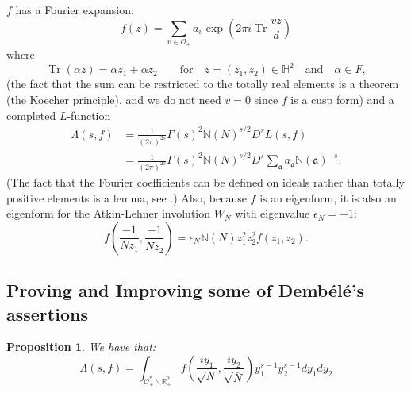 \documentclass{article}
\DeclareMathOperator{\Tr}{Tr}
\theoremstyle{plain}
\newtheorem{proposition}{Proposition}
\begin{document}
$f$ has a Fourier expansion:
\begin{equation*}
f(z)=\sum_{v \in \mathcal{O}_+} a_v \exp\left(2\pi i\Tr \frac{v z}{d}\right)
\end{equation*}
where
\begin{equation*}
\Tr(\alpha z) = \alpha z_1 + \bar{\alpha}z_2 \qquad \text{for} \quad z=(z_1, z_2) \in \mathbb{H}^2 \quad \text{and} \quad \alpha \in F,
\end{equation*}
(the fact that the sum can be restricted to the totally real elements is a theorem (the Koecher principle), and we do not need $v=0$ since $f$ is a cusp form) and a completed $L$-function
\begin{align*}
\Lambda(s,f) & = \frac{1}{(2\pi)^{2s}} \Gamma(s)^2 \mathbb{N}(N)^{s/2} D^s L(s,f)\\
&= \frac{1}{(2\pi)^{2s}} \Gamma(s)^2 \mathbb{N}(N)^{s/2} D^s \sum_{\mathfrak{a}}a_{\mathfrak{a}}\mathbb{N}(\mathfrak{a})^{-s}.
\end{align*}
(The fact that the Fourier coefficients can be defined on ideals rather than totally positive elements is a lemma, see \cite[Section 1.7]{bump}.)
Also, because $f$ is an eigenform, it is also an eigenform for the Atkin-Lehner involution $W_N$ with eigenvalue $\epsilon_N= \pm 1$:
\begin{equation*}
f\left(\frac{-1}{Nz_1},\frac{-1}{\bar{N}z_2} \right)=\epsilon_N \mathbb{N}(N)z_1^2z_2^2f(z_1, z_2).
\end{equation*}

\subsection{Proving and Improving some of Demb\'{e}l\'{e}'s assertions}

\begin{proposition}
We have that:
\begin{equation*}
\Lambda(s,f)= \int_{\mathcal{O}_+^*\backslash \mathbb{R}^2_+} f\left(\frac{iy_1}{\sqrt{N}},\frac{iy_2}{\sqrt{\bar{N}}}\right) y_1^{s-1}y_2^{s-1} dy_1 dy_2
\end{equation*}
\end{proposition}
\end{document}
